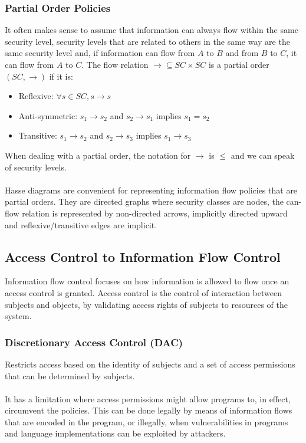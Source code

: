 \documentclass[10pt,a4paper]{report}
\begin{document}
\subsubsection{Partial Order Policies}
It often makes sense to assume that information can always flow within the same security level, security levels that are related to others in the same way are the same security level and, if information can flow from $A$ to $B$ and from $B$ to $C$, it can flow from $A$ to $C$. The flow relation $\rightarrow \subseteq SC \times SC$ is a partial order $(SC,\rightarrow)$ if it is:
\begin{itemize}
\item Reflexive: $\forall s \in SC, s \rightarrow s$
\item Anti-symmetric: $s_1 \rightarrow s_2$ and $s_2 \rightarrow s_1$ implies $s_1 = s_2$
\item Transitive: $s_1 \rightarrow s_2$ and $s_2 \rightarrow s_3$ implies $s_1 \rightarrow s_3$
\end{itemize}
When dealing with a partial order, the notation for $\rightarrow$ is $\leq$ and we can speak of security levels.\\
\\
Hasse diagrams are convenient for representing information flow policies that are partial orders. They are directed graphs where security classes are nodes, the can-flow relation is represented by non-directed arrows, implicitly directed upward and reflexive/transitive edges are implicit.
\subsection{Access Control to Information Flow Control}
Information flow control focuses on how information is allowed to flow once an access control is granted. Access control is the control of interaction between subjects and objects, by validating access rights of subjects to resources of the system.
\subsubsection{Discretionary Access Control (DAC)}
Restricts access based on the identity of subjects and a set of access permissions that can be determined by subjects.\\
\\
It has a limitation where access permissions might allow programs to, in effect, circumvent the policies. This can be done legally by means of information flows that are encoded in the program, or illegally, when vulnerabilities in programs and language implementations can be exploited by attackers.
\end{document}
